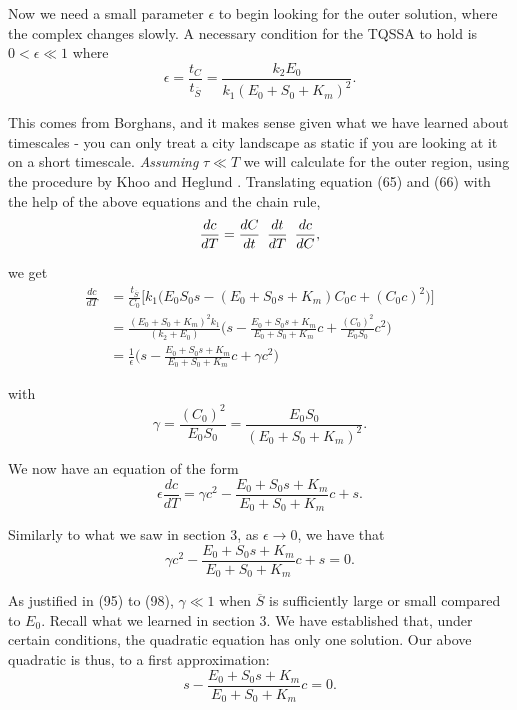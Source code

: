 \documentclass[12pt]{article}
\begin{document}
Now we need a small parameter $\epsilon$ to begin looking for the
outer solution, where the complex changes slowly. A necessary
condition for the TQSSA to hold is $0 < \epsilon \ll 1$ where
\begin{equation}
\epsilon = \frac{t_C}{t_{\overline{S}}} = \frac{k_2 E_0}{k_1(E_0+S_0+K_m)^2}.
\end{equation}

This comes from Borghans, and it makes sense given what we have
learned about timescales - you can only treat a city landscape as
static if you are looking at it on a short
timescale. \textit{Assuming} $\tau \ll T$ we will calculate for the
outer region, using the procedure by Khoo and Heglund
\cite{khoo2008total}. Translating equation (65) and (66) with the help
of the above equations and the chain rule,
\begin{equation}
\frac{dc}{dT} = \frac{dC}{dt} \enskip \frac{dt}{dT} \enskip \frac{dc}{dC},
\end{equation}

we get
\begin{align}
\frac{dc}{dT} &= \frac{t_{\overline{S}}}{C_0}
       \Big[k_1 \Big(E_0 S_0 s - (E_0 + S_0 s + K_m) C_0 c + (C_0 c)^2
                   \Big)\Big] \\
              &= \frac{(E_0+S_0+K_m)^2 k_1}{(k_2 + E_0)}
                 \Big(s - \frac{E_0+S_0 s+K_m}{E_0 + S_0 + K_m} c
                        + \frac{(C_0)^2}{E_0 S_0} c^2 \Big) \\
              &= \frac{1}{\epsilon}
                 \Big(s - \frac{E_0+S_0 s+K_m}{E_0 + S_0 + K_m} c
                        +  \gamma c^2 \Big)
\end{align}

with
\begin{equation}
\gamma = \frac{(C_0)^2}{E_0 S_0} = \frac{E_0 S_0}{(E_0 + S_0 + K_m)^2}.
\end{equation}

We now have an equation of the form
\begin{equation}
  \epsilon \frac{dc}{dT} = \gamma c^2 - \frac{E_0+S_0 s+K_m}{E_0 + S_0 + K_m} c+ s.
\end{equation}

Similarly to what we saw in section 3, as $\epsilon \to 0$, we have that
\begin{equation}
   \gamma c^2  - \frac{E_0+S_0 s+K_m}{E_0 + S_0 + K_m} c + s = 0.
\end{equation}

As justified in (95) to (98), $\gamma \ll 1$ when $\overline{S}$ is
sufficiently large or small compared to $E_0$. Recall what we learned
in section 3. We have established that, under certain conditions, the
quadratic equation has only one solution. Our above quadratic is thus,
to a first approximation:
\begin{equation}
  s - \frac{E_0+S_0 s+K_m}{E_0 + S_0 + K_m} c = 0.
\end{equation}
\end{document}

